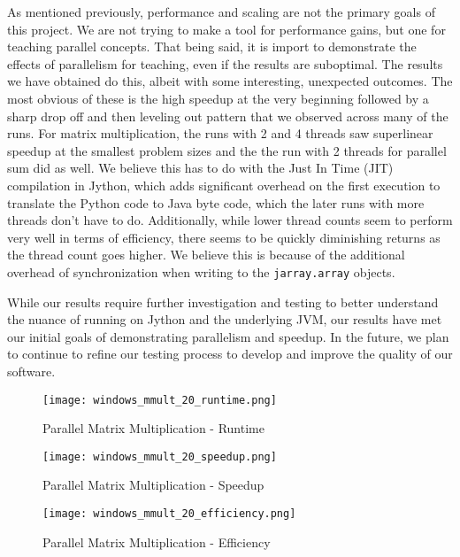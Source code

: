 \documentclass[letterpaper,12pt]{article} %
\begin{document}
As mentioned previously, performance and scaling are not the primary goals of this project. We are not trying to make a tool for performance gains, but one for teaching parallel concepts. That being said, it is import to demonstrate the effects of parallelism for teaching, even if the results are suboptimal. The results we have obtained do this, albeit with some interesting, unexpected outcomes. The most obvious of these is the high speedup at the very beginning followed by a sharp drop off and then leveling out pattern that we observed across many of the runs. For matrix multiplication, the runs with 2 and 4 threads saw superlinear speedup at the smallest problem sizes and the the run with 2 threads for parallel sum did as well. We believe this has to do with the Just In Time (JIT) compilation in Jython, which adds significant overhead on the first execution to translate the Python code to Java byte code, which the later runs with more threads don't have to do. Additionally, while lower thread counts seem to perform very well in terms of efficiency, there seems to be quickly diminishing returns as the thread count goes higher. We believe this is because of the additional overhead of synchronization when writing to the \texttt{jarray.array} objects. 

While our results require further investigation and testing to better understand the nuance of running on Jython and the underlying JVM, our results have met our initial goals of demonstrating parallelism and speedup. In the future, we plan to continue to refine our testing process to develop and improve the quality of our software.


\begin{figure} [H]
    \centering
          {\texttt{[image: windows\_mmult\_20\_runtime.png]}}
        \caption{Parallel Matrix Multiplication - Runtime}
        \label{fig:mmult_runtime}
    \centering
\end{figure}


\begin{figure} [H]
    \centering
          {\texttt{[image: windows\_mmult\_20\_speedup.png]}}
        \caption{Parallel Matrix Multiplication - Speedup}
        \label{fig:mmult_speedup}
    \centering
\end{figure}


\begin{figure} [H]
    \centering
          {\texttt{[image: windows\_mmult\_20\_efficiency.png]}}
        \caption{Parallel Matrix Multiplication - Efficiency}
        \label{fig:mmult_efficiency}
    \centering
\end{figure}
\end{document}

